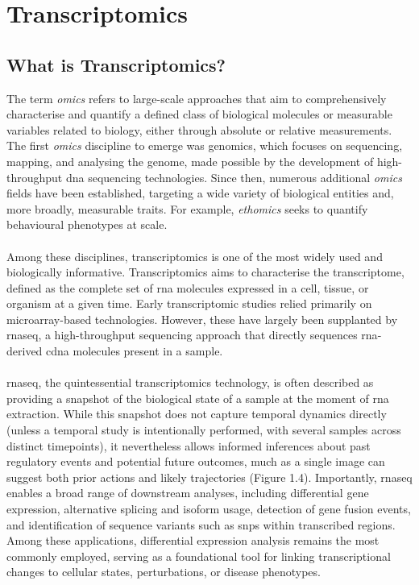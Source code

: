 \section{Transcriptomics}

\subsection{What is Transcriptomics?}

The term \textit{omics} refers to large-scale approaches that aim to comprehensively characterise and quantify a defined class of biological molecules or measurable variables related to biology, either through absolute or relative measurements\cite{yamada_interpretation_2021}. The first \textit{omics} discipline to emerge was genomics, which focuses on sequencing, mapping, and analysing the genome, made possible by the development of high-throughput \gls{dna} sequencing technologies\cite{lowe_transcriptomics_2017}. Since then, numerous additional \textit{omics} fields have been established, targeting a wide variety of biological entities and, more broadly, measurable traits. For example, \textit{ethomics} seeks to quantify behavioural phenotypes at scale\cite{branson_high-throughput_2009}.
\\
\\
Among these disciplines, transcriptomics is one of the most widely used and biologically informative\cite{lowe_transcriptomics_2017}. Transcriptomics aims to characterise the transcriptome, defined as the complete set of \gls{rna} molecules expressed in a cell, tissue, or organism at a given time\cite{lowe_transcriptomics_2017}. Early transcriptomic studies relied primarily on microarray-based technologies\cite{lowe_transcriptomics_2017}. However, these have largely been supplanted by \gls{rnaseq}, a high-throughput sequencing approach that directly sequences \gls{rna}-derived \gls{cdna} molecules present in a sample\cite{lowe_transcriptomics_2017}.
\\
\\
\gls{rnaseq}, the quintessential transcriptomics technology, is often described as providing a snapshot of the biological state of a sample at the moment of \gls{rna} extraction\cite{chu_rna_2012}. While this snapshot does not capture temporal dynamics directly (unless a temporal study is intentionally performed, with several samples across distinct timepoints), it nevertheless allows informed inferences about past regulatory events and potential future outcomes, much as a single image can suggest both prior actions and likely trajectories\cite{chu_rna_2012} (Figure 1.4). Importantly, \gls{rnaseq} enables a broad range of downstream analyses, including differential gene expression, alternative splicing and isoform usage, detection of gene fusion events, and identification of sequence variants such as \glspl{snp} within transcribed regions\cite{lowe_transcriptomics_2017, chu_rna_2012}. Among these applications, differential expression analysis remains the most commonly employed, serving as a foundational tool for linking transcriptional changes to cellular states, perturbations, or disease phenotypes\cite{lowe_transcriptomics_2017, chu_rna_2012}.

